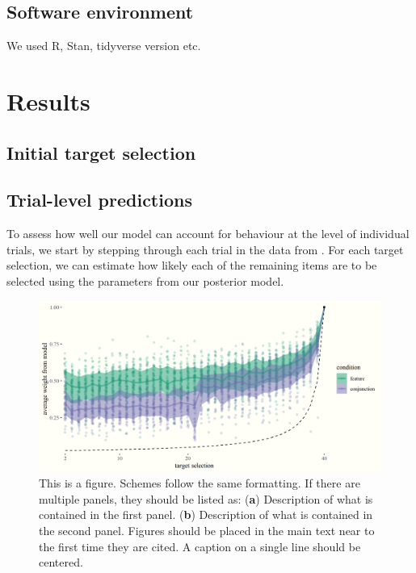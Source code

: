 \documentclass[vision,article,submit,pdftex,moreauthors]{Definitions/mdpi}
\begin{document}
\subsection{Software environment}
 
 We used R, Stan, tidyverse version etc. 



\section{Results}

\subsection{Initial target selection}


\subsection{Trial-level predictions}

To assess how well our model can account for behaviour at the level of individual trials, we start by stepping through each trial in the data from \cite{clarke2022qjep}. For each target selection, we can estimate how likely each of the remaining items are to be selected using the parameters from our posterior model. 

\begin{figure}[H]
\includegraphics[width=12 cm]{Figures/qjep_preds.png}
\caption{This is a figure. Schemes follow the same formatting. If there are multiple panels, they should be listed as: (\textbf{a}) Description of what is contained in the first panel. (\textbf{b}) Description of what is contained in the second panel. Figures should be placed in the main text near to the first time they are cited. A caption on a single line should be centered.\label{fig1}}
\end{figure}   
\end{document}
